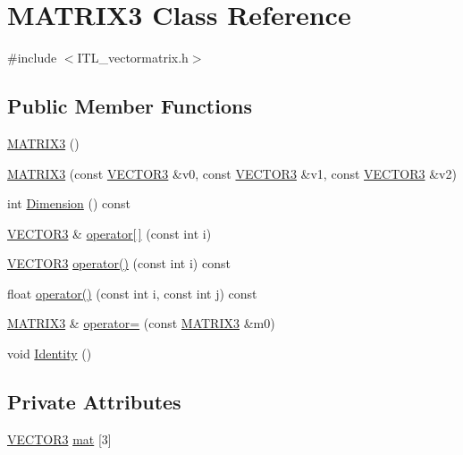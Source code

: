 \hypertarget{classMATRIX3}{
\section{MATRIX3 Class Reference}
\label{classMATRIX3}
}


{\ttfamily \#include $<$ITL\_\-vectormatrix.h$>$}

\subsection*{Public Member Functions}
\begin{DoxyCompactItemize}
\item 
\hyperlink{classMATRIX3_a6c4e88b8dc71944f2819d809c8af33db}{MATRIX3} ()
\item 
\hyperlink{classMATRIX3_ae537368e20b379c611c2897396ca879b}{MATRIX3} (const \hyperlink{classVECTOR3}{VECTOR3} \&v0, const \hyperlink{classVECTOR3}{VECTOR3} \&v1, const \hyperlink{classVECTOR3}{VECTOR3} \&v2)
\item 
int \hyperlink{classMATRIX3_ad39ac7b76a15a678c8a74dc8a95e0754}{Dimension} () const 
\item 
\hyperlink{classVECTOR3}{VECTOR3} \& \hyperlink{classMATRIX3_a568cfeb7a853e8f1c6437046ab6c5cb1}{operator\mbox{[}$\,$\mbox{]}} (const int i)
\item 
\hyperlink{classVECTOR3}{VECTOR3} \hyperlink{classMATRIX3_ae4ad5d725102c93251dd1da56dd9fab8}{operator()} (const int i) const 
\item 
float \hyperlink{classMATRIX3_a4c879e29653a167d5af33e297b46bdd4}{operator()} (const int i, const int j) const 
\item 
\hyperlink{classMATRIX3}{MATRIX3} \& \hyperlink{classMATRIX3_a6154de213d293b953f2be789a86a58eb}{operator=} (const \hyperlink{classMATRIX3}{MATRIX3} \&m0)
\item 
void \hyperlink{classMATRIX3_af765df1cefaaacc2e8f1e27f2041ca15}{Identity} ()
\end{DoxyCompactItemize}
\subsection*{Private Attributes}
\begin{DoxyCompactItemize}
\item 
\hyperlink{classVECTOR3}{VECTOR3} \hyperlink{classMATRIX3_ad05b011bf87af20da045df5640013017}{mat} \mbox{[}3\mbox{]}
\end{DoxyCompactItemize}



